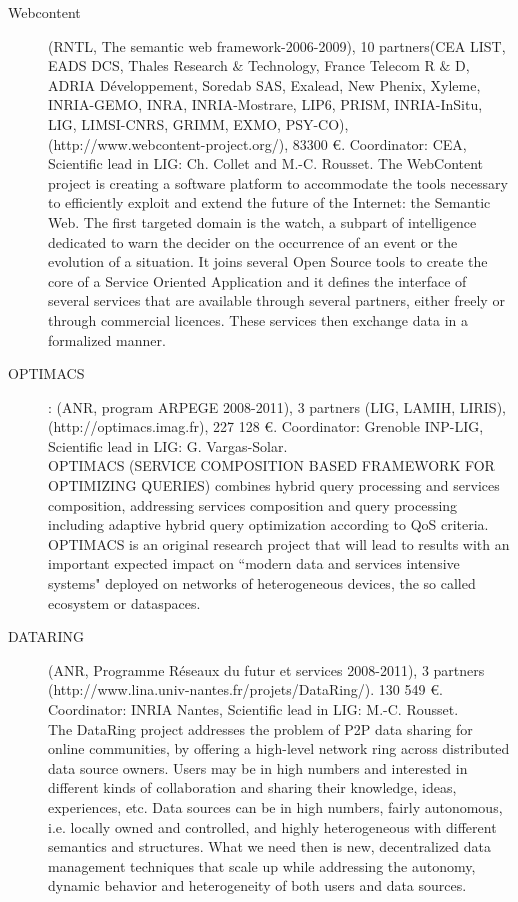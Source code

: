 \begin{description}

\item[Webcontent] (RNTL, The semantic web framework-2006-2009), 10 partners(CEA LIST, EADS DCS, Thales Research  $\&$ Technology, France Telecom R  $\&$ D, ADRIA D{\'e}veloppement, Soredab SAS, Exalead, New Phenix, Xyleme, INRIA-GEMO, INRA, INRIA-Mostrare, LIP6, PRISM, INRIA-InSitu, LIG, LIMSI-CNRS, GRIMM, EXMO, PSY-CO), \\
(http://www.webcontent-project.org/), 83300 \euro. Coordinator: CEA, Scientific lead in LIG: Ch. Collet and M.-C. Rousset. 
The WebContent project is creating a software platform to accommodate the tools necessary to efficiently exploit and extend the future of the Internet: the Semantic Web. The first targeted domain is the watch, a subpart of intelligence dedicated to warn the decider on the occurrence of an event or the evolution of a situation. It joins several Open Source tools to create the core of a Service Oriented Application and it defines the interface of several services that are available through several partners, either freely or through commercial licences. These services then exchange data in a formalized manner.

\item[OPTIMACS]: (ANR, program ARPEGE 2008-2011), 3 partners (LIG, LAMIH, LIRIS),  \\
(http://optimacs.imag.fr), 227 128 \euro. Coordinator: Grenoble INP-LIG, Scientific lead in LIG: G. Vargas-Solar. \\
OPTIMACS (SERVICE COMPOSITION BASED FRAMEWORK FOR OPTIMIZING QUERIES) combines hybrid query processing and services composition, addressing services composition and query processing including adaptive hybrid query optimization according to QoS criteria. OPTIMACS is an original research project that will lead to results with an important expected impact on ``modern data and services intensive systems" deployed on networks of heterogeneous devices, the so called ecosystem or dataspaces.

\item[DATARING] (ANR, Programme R{\'e}seaux du futur et services 2008-2011), 3 partners \\
(http://www.lina.univ-nantes.fr/projets/DataRing/). 130 549 \euro. Coordinator: INRIA Nantes, Scientific lead in LIG: M.-C. Rousset. \\
The DataRing project addresses the problem of P2P data sharing for online communities, by offering a high-level network ring across distributed data source owners. Users may be in high numbers and interested in different kinds of collaboration and sharing their knowledge, ideas, experiences, etc. Data sources can be in high numbers, fairly autonomous, i.e. locally owned and controlled, and highly heterogeneous with different semantics and structures. What we need then is new, decentralized data management techniques that scale up while addressing the autonomy, dynamic behavior and heterogeneity of both users and data sources.


\end{description}
